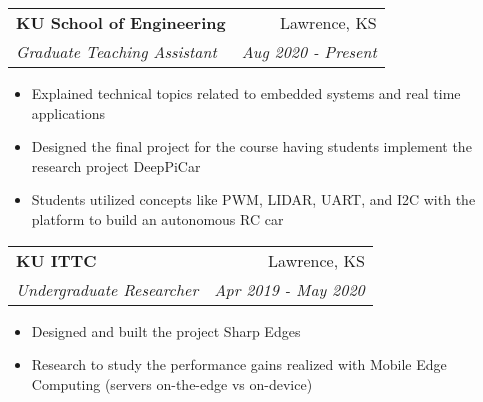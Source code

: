 \documentclass[letterpaper,10pt]{article}
\makeatletter
\newcommand{\resumeItem}[2]{
  \item\normalsize{
    {#1}{#2 \vspace{-2pt}}
  }
}
\newcommand{\resumeSubheading}[4]{
  \vspace{-1pt}\item[]
  \begin{tabular*}{0.98\textwidth}{l@{\extracolsep{\fill}}r}
      \hspace{-10pt}\textbf{#1} & #2 \\
      \hspace{-10pt}\textit{\normalsize#3} & \textit{\normalsize #4} \\
    \end{tabular*}\vspace{-3pt}
}
\newcommand{\resumeItemListStart}{\begin{itemize}}
\newcommand{\resumeItemListEnd}{\end{itemize}\vspace{-5pt}}
\makeatother
\begin{document}
{    \vspace{6pt}
   
    \resumeSubheading
    {KU School of Engineering}{Lawrence, KS}
    {Graduate Teaching Assistant}{Aug 2020 - Present}
      \resumeItemListStart
      \resumeItem{}
        {Explained technical topics related to embedded systems and real time applications}
        \vspace{1pt}
      \resumeItem{}
        {Designed the final project for the course having students implement the research project DeepPiCar}
        \vspace{1pt}
      \resumeItem{}
        {Students utilized concepts like PWM, LIDAR, UART, and I2C with the platform to build an autonomous RC car}
    \resumeItemListEnd

    \vspace{6pt}

    \resumeSubheading
      {KU ITTC}{Lawrence, KS}
      {Undergraduate Researcher}{Apr 2019 - May 2020}
      \resumeItemListStart

        \resumeItem{}
          {Designed and built the project Sharp Edges}
          \vspace{1pt}
        \resumeItem{}
          {Research to study the performance gains realized with Mobile Edge Computing (servers on-the-edge vs on-device)}
      \resumeItemListEnd
      
}
\end{document}

